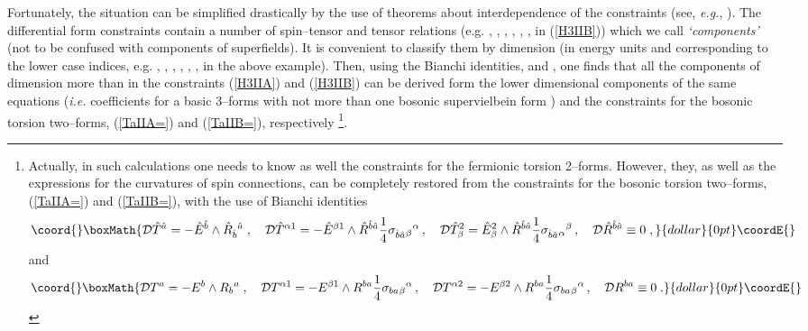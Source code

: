 \documentclass[a4paper,11pt]{article}
\begin{document}
Fortunately, the situation can be simplified drastically by the use of  
theorems about interdependence of the constraints 
(see, {\it e.g.}, \cite{AlgC,HW84,CGO87}). 
The differential form constraints contain a number of spin--tensor and tensor 
relations 
(e.g. \coordHE{}, 
\coordHE{}, \myHighlight{$\ldots$}\coordHE{}, 
 \coordHE{}, 
 \myHighlight{$\ldots$}\coordHE{}, \coordHE{}, \myHighlight{$\ldots$}\coordHE{} in (\ref{H3IIB})) 
which we call {\sl `components'} 
(not to be confused with components of superfields). 
It is convenient to 
classify them by dimension (in energy units and corresponding to the 
lower case indices, e.g. \coordHE{}, \coordHE{}, \myHighlight{$\ldots$}\coordHE{}, \coordHE{}, \myHighlight{$\ldots$}\coordHE{}, \coordHE{}, 
\myHighlight{$\ldots$}\coordHE{} in the above example). Then, 
using the Bianchi identities, \coordHE{} and \coordHE{},  
one finds \cite{HW84,CGO87}  that 
all the components of dimension more than \coordHE{} in the constraints 
(\ref{H3IIA}) and (\ref{H3IIB}) can be derived form the lower dimensional 
components of the same equations 
({\it i.e.} coefficients for a basic 3--forms \coordHE{}  
with not more than 
one bosonic supervielbein form \coordHE{}) 
and the constraints for the 
bosonic torsion two--forms, 
(\ref{TaIIA=}) and (\ref{TaIIB=}), respectively
\footnote{ 
Actually, in such calculations one needs to know as well the constraints for  
the fermionic torsion 2--forms.  
However, they, as well as the expressions for 
the curvatures of spin connections, can be completely restored 
from the constraints for the bosonic torsion two--forms, 
(\ref{TaIIA=}) and (\ref{TaIIB=}), with the use of Bianchi identities  
$$\coord{}\boxMath{{\cal D}\hat{T}^{\hat{a}}= - \hat{E}^{\hat{b}} \wedge \hat{R}_{\hat{b}}{}^
{\hat{a}}\; , \quad  
{\cal D}\hat{T}^{\alpha 1}= - \hat{E}^{\beta 1} \wedge 
\hat{R}^{\hat{b}\hat{a}} {1\over 4} \sigma_{\hat{b}\hat{a}}{}_\beta{}^\alpha
\, , \quad  {\cal D}\hat{T}_{\beta}^2=  \hat{E}_{\beta}^2 \wedge 
\hat{R}^{\hat{b}\hat{a}} {1\over 4} \sigma_{\hat{b}\hat{a}}{}_\alpha{}^\beta 
\, , \quad 
 {\cal D} \hat{R}^{\hat{b}\hat{a}} \equiv 0 \; , }{dollar}{0pt}\coordE{}$$ and 
$$\coord{}\boxMath{{\cal D}{T}^{{a}}= - {E}^{{b}} \wedge {R}_{{b}}{}^
{{a}}\; , \quad  
{\cal D}{T}^{\alpha 1}= - {E}^{\beta 1} \wedge 
{R}^{{b}{a}} {1\over 4} \sigma_{{b}{a}}{}_\beta{}^\alpha
\, , \quad  
{\cal D}{T}^{\alpha 2}= - {E}^{\beta 2} \wedge 
{R}^{{b}{a}} {1\over 4} \sigma_{{b}{a}}{}_\beta{}^\alpha
\, , \quad 
 {\cal D} {R}^{{b}{a}} \equiv 0 \; . }{dollar}{0pt}\coordE{}$$ }.
\end{document}
